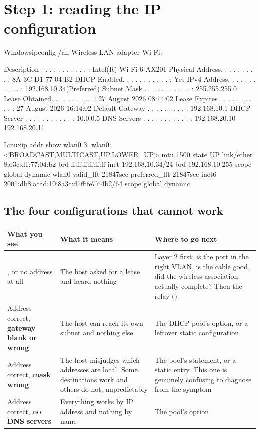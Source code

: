 \section{Step 1: reading the IP configuration}

\begin{hostcmd}{Windows}{ipconfig /all}
Wireless LAN adapter Wi-Fi:

   Description . . . . . . . . . . . : Intel(R) Wi-Fi 6 AX201
   Physical Address. . . . . . . . . : 8A-3C-D1-77-04-B2
   DHCP Enabled. . . . . . . . . . . : Yes
   IPv4 Address. . . . . . . . . . . : 192.168.10.34(Preferred)
   Subnet Mask . . . . . . . . . . . : 255.255.255.0
   Lease Obtained. . . . . . . . . . : 27 August 2026 08:14:02
   Lease Expires . . . . . . . . . . : 27 August 2026 16:14:02
   Default Gateway . . . . . . . . . : 192.168.10.1
   DHCP Server . . . . . . . . . . . : 10.0.0.5
   DNS Servers . . . . . . . . . . . : 192.168.20.10
                                       192.168.20.11
\end{hostcmd}

\begin{hostcmd}{Linux}{ip addr show wlan0}
3: wlan0: <BROADCAST,MULTICAST,UP,LOWER_UP> mtu 1500 state UP
    link/ether 8a:3c:d1:77:04:b2 brd ff:ff:ff:ff:ff:ff
    inet 192.168.10.34/24 brd 192.168.10.255 scope global dynamic wlan0
       valid_lft 21847sec preferred_lft 21847sec
    inet6 2001:db8:acad:10:8a3c:d1ff:fe77:4b2/64 scope global dynamic
\end{hostcmd}

\subsection{The four configurations that cannot work}

\begin{longtable}{@{}L{3.9cm}L{4.8cm}L{6.3cm}@{}}
\toprule
{}
\textbf{What you see} & \textbf{What it means} & \textbf{Where to go next} \\
\midrule
\endhead
{}, or no address at all &
The host asked for a lease and heard nothing &
Layer 2 first: is the port in the right VLAN, is the cable good, did the wireless
association actually complete? Then the relay () \\
Address correct, \textbf{gateway blank or wrong} &
The host can reach its own subnet and nothing else &
The DHCP pool's  option, or a leftover static configuration \\
Address correct, \textbf{mask wrong} &
The host misjudges which addresses are local. Some destinations work and others
do not, unpredictably &
The pool's  statement, or a static entry. This one is genuinely
confusing to diagnose from the symptom \\
Address correct, \textbf{no DNS servers} &
Everything works by IP address and nothing by name &
The pool's  option \\
\bottomrule
\end{longtable}

